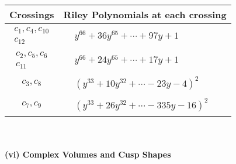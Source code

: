 \documentclass[1p]{elsarticle_modified}
\theoremstyle{definition}
\begin{document}
\begin{tabular}{m{50pt}|m{274pt}}
Crossings & \hspace{64pt}Riley Polynomials at each crossing \\
\hline $$\begin{aligned}c_{1},c_{4},c_{10}\\c_{12}\end{aligned}$$&$\begin{aligned}
&y^{66}+36 y^{65}+\cdots+97 y+1
\end{aligned}$\\
\hline $$\begin{aligned}c_{2},c_{5},c_{6}\\c_{11}\end{aligned}$$&$\begin{aligned}
&y^{66}+24 y^{65}+\cdots+17 y+1
\end{aligned}$\\
\hline $$\begin{aligned}c_{3},c_{8}\end{aligned}$$&$\begin{aligned}
&(y^{33}+10 y^{32}+\cdots-23 y-4)^{2}
\end{aligned}$\\
\hline $$\begin{aligned}c_{7},c_{9}\end{aligned}$$&$\begin{aligned}
&(y^{33}+26 y^{32}+\cdots-335 y-16)^{2}
\end{aligned}$\\
\hline
\end{tabular}\\~\\
\newpage\flushleft \textbf{(vi) Complex Volumes and Cusp Shapes}
\end{document}
